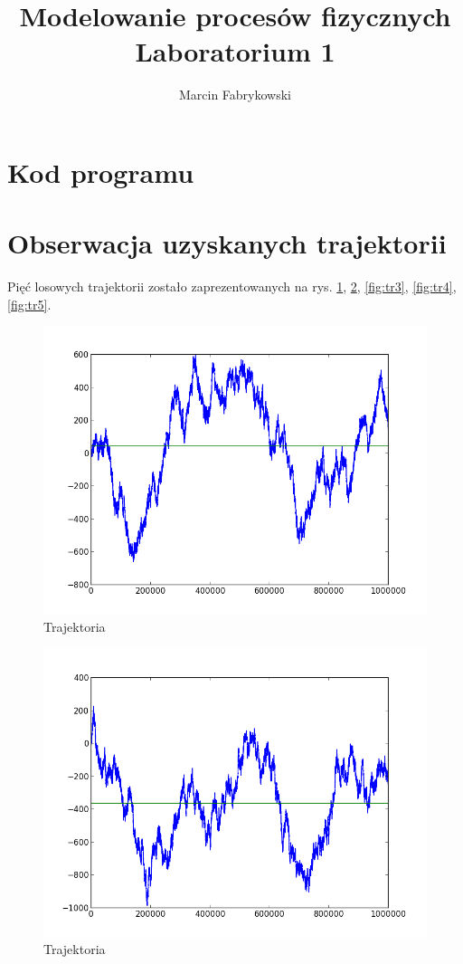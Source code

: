 \documentclass[a4paper, 12pt]{article}
\author{Marcin Fabrykowski}
\title{Modelowanie procesów fizycznych\\Laboratorium 1}
\begin{document}
\maketitle
\newpage
\section{Kod programu}

\section{Obserwacja uzyskanych trajektorii}
Pięć losowych trajektorii zostało zaprezentowanych na rys. \ref{fig:tr1}, \ref{fig:tr2}, \ref{fig:tr3}, \ref{fig:tr4}, \ref{fig:tr5}.
\begin{figure}[h]
\includegraphics[scale=0.5]{traj1.png}
\caption{Trajektoria}
\label{fig:tr1}
\end{figure}
\begin{figure}[h]
\includegraphics[scale=0.5]{traj2.png}
\caption{Trajektoria}
\label{fig:tr2}
\end{figure}
\end{document}
